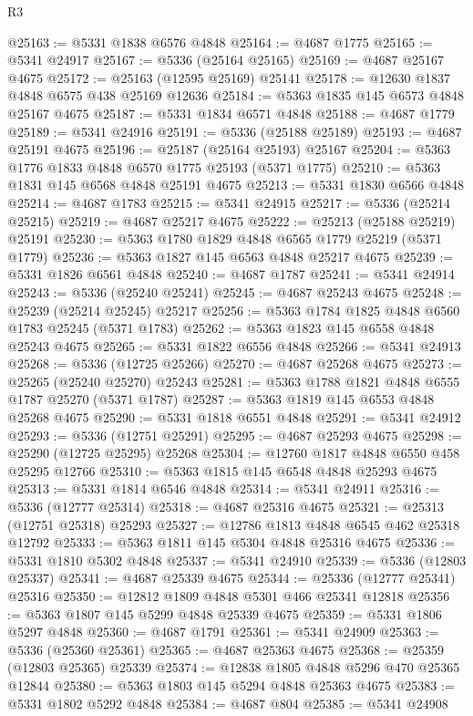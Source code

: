 \begin{lexlean}{R3}
\begin{coremodule}
@25163 := @5331 @1838 @6576 @4848
@25164 := @4687 @1775
@25165 := @5341 @24917
@25167 := @5336 (@25164 @25165)
@25169 := @4687 @25167 @4675
@25172 := @25163 (@12595 @25169) @25141
@25178 := @12630 @1837 @4848 @6575 @438 @25169 @12636
@25184 := @5363 @1835 @145 @6573 @4848 @25167 @4675
@25187 := @5331 @1834 @6571 @4848
@25188 := @4687 @1779
@25189 := @5341 @24916
@25191 := @5336 (@25188 @25189)
@25193 := @4687 @25191 @4675
@25196 := @25187 (@25164 @25193) @25167
@25204 := @5363 @1776 @1833 @4848 @6570 @1775 @25193 (@5371 @1775)
@25210 := @5363 @1831 @145 @6568 @4848 @25191 @4675
@25213 := @5331 @1830 @6566 @4848
@25214 := @4687 @1783
@25215 := @5341 @24915
@25217 := @5336 (@25214 @25215)
@25219 := @4687 @25217 @4675
@25222 := @25213 (@25188 @25219) @25191
@25230 := @5363 @1780 @1829 @4848 @6565 @1779 @25219 (@5371 @1779)
@25236 := @5363 @1827 @145 @6563 @4848 @25217 @4675
@25239 := @5331 @1826 @6561 @4848
@25240 := @4687 @1787
@25241 := @5341 @24914
@25243 := @5336 (@25240 @25241)
@25245 := @4687 @25243 @4675
@25248 := @25239 (@25214 @25245) @25217
@25256 := @5363 @1784 @1825 @4848 @6560 @1783 @25245 (@5371 @1783)
@25262 := @5363 @1823 @145 @6558 @4848 @25243 @4675
@25265 := @5331 @1822 @6556 @4848
@25266 := @5341 @24913
@25268 := @5336 (@12725 @25266)
@25270 := @4687 @25268 @4675
@25273 := @25265 (@25240 @25270) @25243
@25281 := @5363 @1788 @1821 @4848 @6555 @1787 @25270 (@5371 @1787)
@25287 := @5363 @1819 @145 @6553 @4848 @25268 @4675
@25290 := @5331 @1818 @6551 @4848
@25291 := @5341 @24912
@25293 := @5336 (@12751 @25291)
@25295 := @4687 @25293 @4675
@25298 := @25290 (@12725 @25295) @25268
@25304 := @12760 @1817 @4848 @6550 @458 @25295 @12766
@25310 := @5363 @1815 @145 @6548 @4848 @25293 @4675
@25313 := @5331 @1814 @6546 @4848
@25314 := @5341 @24911
@25316 := @5336 (@12777 @25314)
@25318 := @4687 @25316 @4675
@25321 := @25313 (@12751 @25318) @25293
@25327 := @12786 @1813 @4848 @6545 @462 @25318 @12792
@25333 := @5363 @1811 @145 @5304 @4848 @25316 @4675
@25336 := @5331 @1810 @5302 @4848
@25337 := @5341 @24910
@25339 := @5336 (@12803 @25337)
@25341 := @4687 @25339 @4675
@25344 := @25336 (@12777 @25341) @25316
@25350 := @12812 @1809 @4848 @5301 @466 @25341 @12818
@25356 := @5363 @1807 @145 @5299 @4848 @25339 @4675
@25359 := @5331 @1806 @5297 @4848
@25360 := @4687 @1791
@25361 := @5341 @24909
@25363 := @5336 (@25360 @25361)
@25365 := @4687 @25363 @4675
@25368 := @25359 (@12803 @25365) @25339
@25374 := @12838 @1805 @4848 @5296 @470 @25365 @12844
@25380 := @5363 @1803 @145 @5294 @4848 @25363 @4675
@25383 := @5331 @1802 @5292 @4848
@25384 := @4687 @804
@25385 := @5341 @24908

\end{coremodule}
\end{lexlean}
